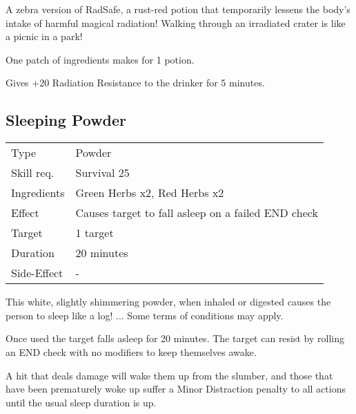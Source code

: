 \documentclass[11pt,a4paper,twocolumn]{book}
\begin{document}
\medskip

A zebra version of RadSafe, a rust-red potion that temporarily lessens the body's intake of harmful magical radiation! Walking through an irradiated crater is like a picnic in a park!

One patch of ingredients makes for 1 potion.

Gives +20 Radiation Resistance to the drinker for 5 minutes.


\subsection*{Sleeping Powder}
{
	\begin{tabu} to 75mm{| X[l,4] | X[l,8] |}
		\hline
		Type 			& Powder 													\\
		Skill req.	    & Survival 25 												\\
		Ingredients     & Green Herbs x2, Red Herbs x2								\\
		Effect     		& Causes target to fall asleep on a failed END check 								\\
		Target      	& 1 target													\\
		Duration  		& 20 minutes	 												\\
		Side-Effect     & -															\\ \hline
	\end{tabu}
	
}

\medskip

This white, slightly shimmering powder, when inhaled or digested causes the person to sleep like a log! ... Some terms of conditions may apply.

Once used the target falls asleep for 20 minutes. The target can resist by rolling an END check with no modifiers to keep themselves awake.

A hit that deals damage will wake them up from the slumber, and those that have been prematurely woke up suffer a Minor Distraction penalty to all actions until the usual sleep duration is up.
\end{document}
